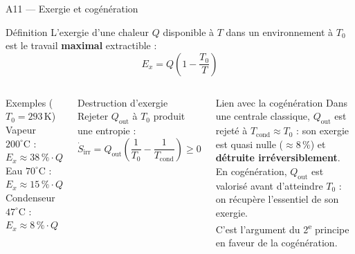 \documentclass[aspectratio=43, 10pt]{beamer}
\newcommand{\Qout}{Q_{\text{out}}}
\begin{document}
\begin{frame}{A11 --- Exergie et cog\'en\'eration}

  \begin{block}{D\'efinition}
    L'exergie d'une chaleur $Q$ disponible \`a $T$
    dans un environnement \`a $T_0$ est le travail
    \textbf{maximal} extractible :
    \[
      E_x = Q\!\left(1 - \frac{T_0}{T}\right)
    \]
  \end{block}

  \begin{columns}[T,onlytextwidth]
      \begin{exampleblock}{Exemples ($T_0 = 293$\,K)}
        \small
        Vapeur $200^\circ\mathrm{C}$ : $E_x \approx 38\,\%\cdot Q$\\
        Eau $70^\circ\mathrm{C}$ : $E_x \approx 15\,\%\cdot Q$\\
        Condenseur $47^\circ\mathrm{C}$ : $E_x \approx 8\,\%\cdot Q$
      \end{exampleblock}

      \vspace{0.3em}
      \begin{block}{Destruction d'exergie}
        \small
        Rejeter $\Qout$ \`a $T_0$ produit une entropie :
        \[
          \dot S_\text{irr}
          = \Qout\!\left(\frac{1}{T_0} - \frac{1}{T_\text{cond}}\right)
          \geq 0
        \]
      \end{block}

      \begin{alertblock}{Lien avec la cog\'en\'eration}
        \small
        Dans une centrale classique,
        $\Qout$ est rejet\'e \`a $T_\text{cond} \approx T_0$ :
        son exergie est quasi nulle ($\approx 8\,\%$)
        et \textbf{d\'etruite irr\'eversiblement}.\\[4pt]
        En cog\'en\'eration, $\Qout$ est valoris\'e
        avant d'atteindre $T_0$ :
        on r\'ecup\`ere l'essentiel de son exergie.\\[4pt]
        C'est l'argument du 2\textsuperscript{e} principe
        en faveur de la cog\'en\'eration.
      \end{alertblock}
  \end{columns}

\end{frame}
\end{document}
